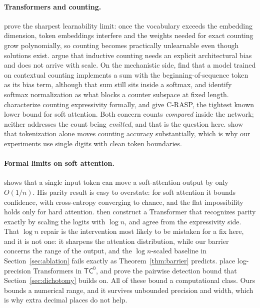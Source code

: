 \documentclass[10pt]{article}
\theoremstyle{definition}
\begin{document}
\paragraph{Transformers and counting.}

\citet{yehudai2024count} prove the sharpest learnability limit: once the
vocabulary exceeds the embedding dimension, token embeddings interfere and
the weights needed for exact counting grow polynomially, so counting
becomes practically unlearnable even though solutions exist.
\citet{chang2024counting} argue that inductive counting needs an explicit
architectural bias and does not arrive with scale. On the mechanistic side,
\citet{golkar2024contextual} find that a model trained on contextual
counting implements a sum with the beginning-of-sequence token as its bias
term, although that sum still sits inside a softmax, and
\citet{cagnetta2024small} identify softmax normalization as what blocks a
counter subspace at fixed length. \citet{salzer2026counting} characterize
counting expressivity formally, and \citet{yang2024counting} give C-RASP,
the tightest known lower bound for soft attention. Both concern counts
\emph{compared} inside the network; neither addresses the count being
\emph{emitted}, and that is the question here. \citet{zhang2024tokenization} show that tokenization alone moves counting
accuracy substantially, which is why our experiments use single digits
with clean token boundaries.

\paragraph{Formal limits on soft attention.}

\citet{hahn2020} shows that a single input token can move a soft-attention
output by only $O(1/n)$. His parity result is easy to overstate: for soft
attention it bounds confidence, with cross-entropy converging to chance,
and the flat impossibility holds only for hard attention.
\citet{chiang2022} then construct a Transformer that recognizes parity
exactly by scaling the logits with $\log n$, and \citet{salzer2026counting}
agree from the expressivity side. That $\log n$ repair is the intervention
most likely to be mistaken for a fix here, and it is not one: it sharpens
the attention distribution, while our barrier concerns the range of the
output, and the $\log n$-scaled baseline in Section~\ref{sec:ablation}
fails exactly as Theorem~\ref{thm:barrier} predicts. \citet{merrill2023}
place log-precision Transformers in $\mathsf{TC}^0$, and \citet{sanford2023}
prove the pairwise detection bound that Section~\ref{sec:dichotomy} builds
on. All of these bound a computational class. Ours bounds a numerical
range, and it survives unbounded precision and width, which is why extra
decimal places do not help.
\end{document}
